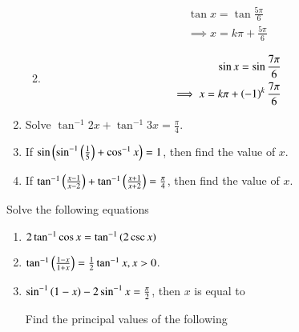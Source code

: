 \begin{enumerate}[label=\thesubsection.\arabic*,ref=\thesubsection.\theenumi]
\begin{enumerate}
\begin{align}
\tan x=\tan \frac{5\pi}{6}
\\
\implies
x = k\pi + \frac{5\pi}{6}
\end{align}
\item 
\begin{align}
\sin x=\sin \frac{7\pi}{6}
\\
	\implies x = k\pi + \left(-1\right)^k\frac{7\pi}{6}
\end{align}
\end{enumerate}
\item 	Solve $\tan^{-1}2x +\tan^{-1}3x=\frac{\pi}{4}$.
	\item If 
		$\sin\left(\sin^{-1}\left(\frac{1}{5}\right) + \cos^{-1}x\right)=1$, then find the value of $x$.
	\item If 
		$\tan^{-1}\left(\frac{x-1}{x-2}\right) +\tan^{-1}\left(\frac{x+1}{x+2}\right)=\frac{\pi}{4}$, then find the value of $x$.
\end{enumerate}
Solve the following equations
\begin{enumerate}[label=\thesubsection.\arabic*,ref=\thesubsection.\theenumi,resume*,itemsep=1ex]
	\item 
		$2\tan^{-1}\cos{x}=
		\tan^{-1}\left(2\csc{x}\right)$
	\item 
		$\tan^{-1}\left(\frac{1-x}{1+x}\right)=\frac{1}{2}\tan^{-1}x, x > 0$.
	\item $\sin^{-1}\left(1-x\right)-2\sin^{-1}x=\frac{\pi}{2}$, then $x$ is equal to
\begin{enumerate}
\end{enumerate}
Find the principal values of the following
\begin{enumerate}[label=\thesubsection.\arabic*,ref=\thesubsection.\theenumi,itemsep=1ex]
\end{enumerate}
\end{enumerate}
